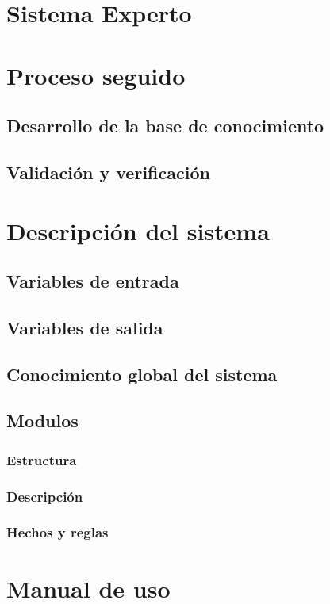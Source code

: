 \chapter{Sistema Experto}

\chapter{Proceso seguido}
\section{Desarrollo de la base de conocimiento}
\section{Validación y verificación}

\chapter{Descripción del sistema}
\section{Variables de entrada}
\section{Variables de salida}
\section{Conocimiento global del sistema}
\section{Modulos}
\subsection{Estructura}
\subsection{Descripción}
\subsection{Hechos y reglas}

\chapter{Manual de uso}
